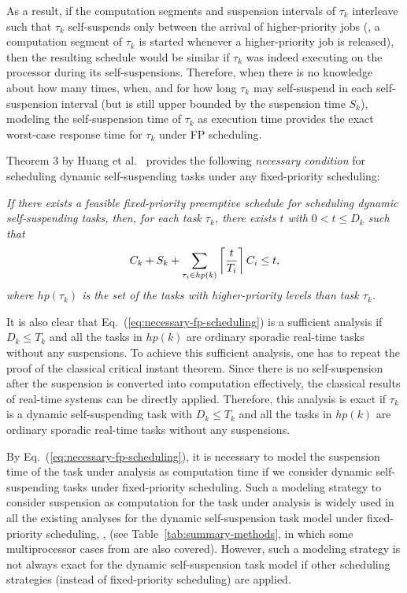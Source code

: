 As a result, if the computation segments and suspension intervals of $\tau_k$ interleave such that $\tau_k$ self-suspends only between the arrival of higher-priority jobs
(\ie,  a computation segment of $\tau_k$ is started whenever a higher-priority job is released), then the resulting schedule would be similar if $\tau_k$ was indeed executing on the processor during its self-suspensions. Therefore, when there is no knowledge about how many times, when, and for how long $\tau_k$ may self-suspend in each 
self-suspension interval (but is still upper bounded by the suspension time $S_k$), modeling the self-suspension time of $\tau_k$ as execution time provides the exact worst-case response 
time for $\tau_k$ under FP scheduling. 



Theorem 3 by Huang et al.~\cite{huangpass:dac2015} provides the following \emph{necessary condition} for scheduling dynamic self-suspending tasks under any fixed-priority scheduling: 

\emph{ If there exists a feasible fixed-priority preemptive schedule for scheduling dynamic self-suspending tasks, then, for each task $\tau_k$, there exists $t$ with $0 < t \leq D_k$ such that}
  \begin{equation}
    \label{eq:necessary-fp-scheduling}
    C_k+S_k + \sum_{\tau_i \in
      hp(k)} \left\lceil{\frac{t}{T_i}}\right\rceil C_i   \leq t,
  \end{equation}
\emph{where $hp(\tau_k)$ is the set of the tasks with higher-priority levels than task $\tau_k$.} 

It is also clear that Eq.~(\ref{eq:necessary-fp-scheduling}) is a sufficient analysis if $D_k \leq T_k$ and all the tasks in $hp(k)$ are ordinary sporadic real-time tasks without any suspensions. To achieve this sufficient analysis, one has to repeat the proof of the classical critical instant theorem. Since there is no self-suspension after the suspension is converted into computation effectively, the classical results of real-time systems can be directly applied.
Therefore, this analysis is exact if $\tau_k$ is a dynamic self-suspending task with $D_k \leq T_k$ and all the tasks in $hp(k)$ are ordinary sporadic real-time tasks without any suspensions.


By Eq.~(\ref{eq:necessary-fp-scheduling}), it is necessary to model the suspension time of the task under analysis as computation time if we consider dynamic self-suspending tasks under fixed-priority scheduling. Such a modeling strategy to consider suspension as computation for the task under analysis is widely used in all the existing analyses for the dynamic self-suspension task model under fixed-priority scheduling, \eg, \cite{LiuChen:rtss2014,huangpass:dac2015,MingLiRTCSA1994,RTCSA-KimCPKH95,RTAS-AudsleyB04,ECRTS-AudsleyB04,Liu:2000:RS:518501} (see Table~\ref{tab:summary-methods}, in which some multiprocessor cases from \cite{DBLP:conf/ecrts/LiuA13,DBLP:conf/ecrts/LiuCH014} are also covered). However, such a modeling strategy is not always exact for the dynamic self-suspension task model if other scheduling strategies (instead of fixed-priority scheduling) are applied.



